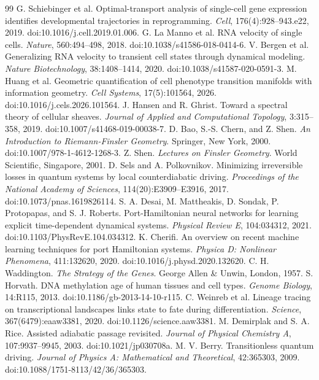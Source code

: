 \documentclass[11pt,a4paper]{article}
\theoremstyle{definition}
\theoremstyle{remark}
\begin{document}
\begin{thebibliography}{99}
 G. Schiebinger et al. Optimal-transport analysis of single-cell gene expression identifies developmental trajectories in reprogramming. \emph{Cell}, 176(4):928--943.e22, 2019. doi:10.1016/j.cell.2019.01.006.
 G. La Manno et al. RNA velocity of single cells. \emph{Nature}, 560:494--498, 2018. doi:10.1038/s41586-018-0414-6.
 V. Bergen et al. Generalizing RNA velocity to transient cell states through dynamical modeling. \emph{Nature Biotechnology}, 38:1408--1414, 2020. doi:10.1038/s41587-020-0591-3.
 M. Huang et al. Geometric quantification of cell phenotype transition manifolds with information geometry. \emph{Cell Systems}, 17(5):101564, 2026. doi:10.1016/j.cels.2026.101564.
 J. Hansen and R. Ghrist. Toward a spectral theory of cellular sheaves. \emph{Journal of Applied and Computational Topology}, 3:315--358, 2019. doi:10.1007/s41468-019-00038-7.
 D. Bao, S.-S. Chern, and Z. Shen. \emph{An Introduction to Riemann-Finsler Geometry}. Springer, New York, 2000. doi:10.1007/978-1-4612-1268-3.
 Z. Shen. \emph{Lectures on Finsler Geometry}. World Scientific, Singapore, 2001.
 D. Sels and A. Polkovnikov. Minimizing irreversible losses in quantum systems by local counterdiabatic driving. \emph{Proceedings of the National Academy of Sciences}, 114(20):E3909--E3916, 2017. doi:10.1073/pnas.1619826114.
 S. A. Desai, M. Mattheakis, D. Sondak, P. Protopapas, and S. J. Roberts. Port-Hamiltonian neural networks for learning explicit time-dependent dynamical systems. \emph{Physical Review E}, 104:034312, 2021. doi:10.1103/PhysRevE.104.034312.
 K. Cherifi. An overview on recent machine learning techniques for port Hamiltonian systems. \emph{Physica D: Nonlinear Phenomena}, 411:132620, 2020. doi:10.1016/j.physd.2020.132620.
 C. H. Waddington. \emph{The Strategy of the Genes}. George Allen \& Unwin, London, 1957.
 S. Horvath. DNA methylation age of human tissues and cell types. \emph{Genome Biology}, 14:R115, 2013. doi:10.1186/gb-2013-14-10-r115.
 C. Weinreb et al. Lineage tracing on transcriptional landscapes links state to fate during differentiation. \emph{Science}, 367(6479):eaaw3381, 2020. doi:10.1126/science.aaw3381.
 M. Demirplak and S. A. Rice. Assisted adiabatic passage revisited. \emph{Journal of Physical Chemistry A}, 107:9937--9945, 2003. doi:10.1021/jp030708a.
 M. V. Berry. Transitionless quantum driving. \emph{Journal of Physics A: Mathematical and Theoretical}, 42:365303, 2009. doi:10.1088/1751-8113/42/36/365303.

\end{thebibliography}
\end{document}

